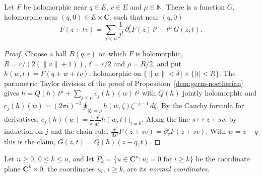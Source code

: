 \begin{lemma}
\label{mc:taylor-tail}
\leanok
Let \(F\) be holomorphic near \(q\in E\), \(v\in E\) and \(\mu\in\mathbb N\). There is a function \(G\), holomorphic near
\((q,0)\in E\times\mathbf C\), such that near \((q,0)\)
\[
 F(z+tv)=\sum_{j<\mu}\frac{1}{j!}\,\partial_v^jF(z)\,t^j+t^\mu\,G(z,t).
\]
\end{lemma}
\begin{proof}
\leanok
Choose a ball \(B(q,r)\) on which \(F\) is holomorphic, \(R=r/(2(\|v\|+1))\), \(\delta=r/2\) and \(\rho=R/2\), and put
\(h(w,t)=F(q+w+tv)\), holomorphic on \(\{\|w\|<\delta\}\times\{|t|<R\}\). The parametric Taylor division of the
proof of Proposition~\ref{dem:germ-noetherian} gives \(h=Q(h)\,t^\mu+\sum_{j<\mu}c_j(h)(w)\,t^j\) with \(Q(h)\) jointly
holomorphic and \(c_j(h)(w)=(2\pi i)^{-1}\oint_{|\zeta|=\rho}h(w,\zeta)\zeta^{-j-1}\,d\zeta\). By the Cauchy formula for
derivatives, \(c_j(h)(w)=\frac1{j!}\frac{d^j}{dt^j}h(w,t)|_{t=0}\). Along the line \(s\mapsto z+sv\), by induction on \(j\)
and the chain rule, \(\frac{d^j}{ds^j}F(z+sv)=\partial_v^jF(z+sv)\). With \(w=z-q\) this is the claim, \(G(z,t)=Q(h)(z-q,t)\).
\end{proof}

Let \(n\ge0\), \(0\le k\le n\), and let \(P_k=\{u\in\mathbf C^n: u_i=0\text{ for }i\ge k\}\) be the coordinate plane \(\mathbf C^k\times0\);
the coordinates \(u_i\), \(i\ge k\), are its \emph{normal coordinates}.

